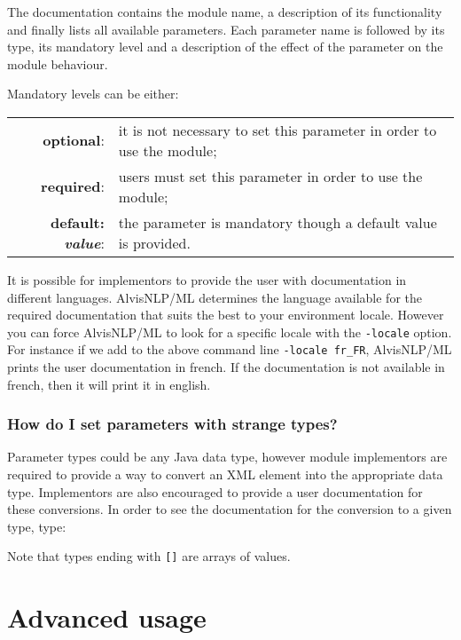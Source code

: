 \documentclass[a4paper]{book}
\begin{document}
The documentation contains the module name, a description of its functionality and finally lists all available parameters.
Each parameter name is followed by its type, its mandatory level and a description of the effect of the parameter on the module behaviour.

Mandatory levels can be either:
\begin{flushleft}
\begin{tabular}{rl}
\textbf{optional}: & it is not necessary to set this parameter in order to use the module;\\
\textbf{required}: & users must set this parameter in order to use the module;\\
\textbf{default: \emph{value}}: & the parameter is mandatory though a default value is provided.\\
\end{tabular}
\end{flushleft}

It is possible for implementors to provide the user with documentation in different languages.
AlvisNLP/ML determines the language available for the required documentation that suits the best to your environment locale.
However you can force AlvisNLP/ML to look for a specific locale with the \texttt{-locale} option.
For instance if we add to the above command line \texttt{-locale fr\_FR}, AlvisNLP/ML prints the user documentation in french.
If the documentation is not available in french, then it will print it in english.

\subsection{How do I set parameters with strange types?}

Parameter types could be any Java data type, however module implementors are required to provide a way to convert an XML element into the appropriate data type.
Implementors are also encouraged to provide a user documentation for these conversions.
In order to see the documentation for the conversion to a given type, type:


Note that types ending with \texttt{[]} are arrays of values.

\chapter{Advanced usage}
\end{document}
